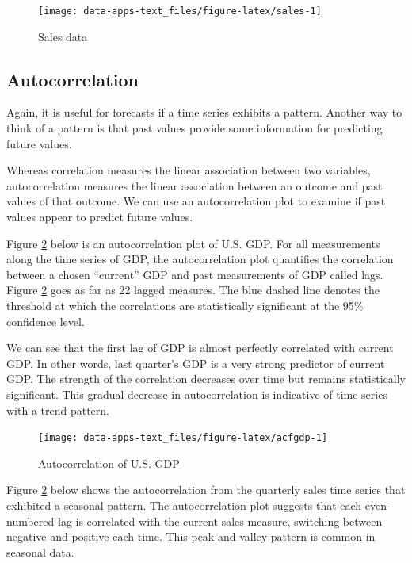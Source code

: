 \documentclass[
]{book}
\begin{document}
\begin{figure}

{\centering \texttt{[image: data-apps-text\_files/figure-latex/sales-1]} 

}

\caption{Sales data}\label{fig:sales}
\end{figure}

\hypertarget{autocorrelation}{%
\subsection{Autocorrelation}\label{autocorrelation}}

Again, it is useful for forecasts if a time series exhibits a pattern. Another way to think of a pattern is that past values provide some information for predicting future values.

Whereas correlation measures the linear association between two variables, autocorrelation measures the linear association between an outcome and past values of that outcome. We can use an autocorrelation plot to examine if past values appear to predict future values.

Figure \ref{fig:acfgdp} below is an autocorrelation plot of U.S. GDP. For all measurements along the time series of GDP, the autocorrelation plot quantifies the correlation between a chosen ``current'' GDP and past measurements of GDP called lags. Figure \ref{fig:acfgdp} goes as far as 22 lagged measures. The blue dashed line denotes the threshold at which the correlations are statistically significant at the 95\% confidence level.

We can see that the first lag of GDP is almost perfectly correlated with current GDP. In other words, last quarter's GDP is a very strong predictor of current GDP. The strength of the correlation decreases over time but remains statistically significant. This gradual decrease in autocorrelation is indicative of time series with a trend pattern.

\begin{figure}

{\centering \texttt{[image: data-apps-text\_files/figure-latex/acfgdp-1]} 

}

\caption{Autocorrelation of U.S. GDP}\label{fig:acfgdp}
\end{figure}

Figure \ref{fig:acfgdp} below shows the autocorrelation from the quarterly sales time series that exhibited a seasonal pattern. The autocorrelation plot suggests that each even-numbered lag is correlated with the current sales measure, switching between negative and positive each time. This peak and valley pattern is common in seasonal data.
\end{document}
